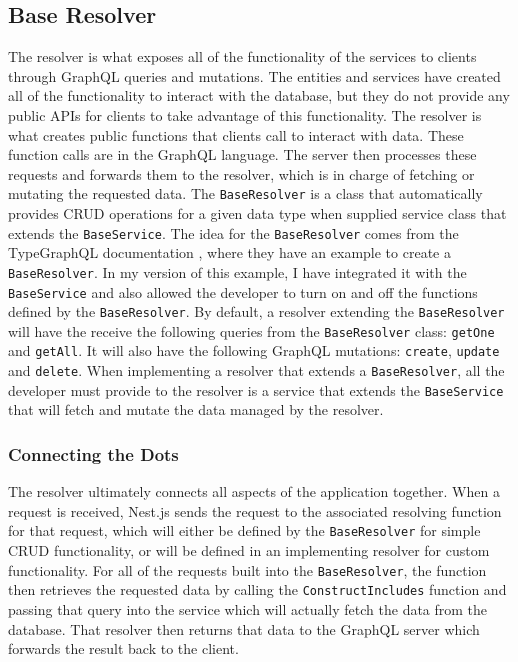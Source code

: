 \subsection{Base Resolver}
The resolver is what exposes all of the functionality of the services to clients through GraphQL queries and mutations. The entities and services have created all of the functionality to interact with the database, but they do not provide any public APIs for clients to take advantage of this functionality.  The resolver is what creates public functions that clients call to interact with data.  These function calls are in the GraphQL language.  The server then processes these requests and forwards them to the resolver, which is in charge of fetching or mutating the requested data.  The \verb!BaseResolver! is a class that automatically provides CRUD operations for a given data type when supplied service class that extends the \verb!BaseService!. The idea for the \verb!BaseResolver! comes from the TypeGraphQL documentation \cite{lytekTypegraphql2019}, where they have an example to create a \verb!BaseResolver!.  In my version of this example, I have integrated it with the \verb!BaseService! and also allowed the developer to turn on and off the functions defined by the \verb!BaseResolver!. By default, a resolver extending the \verb!BaseResolver! will have the receive the following queries from the \verb!BaseResolver! class: \verb!getOne! and \verb!getAll!.  It will also have the following GraphQL mutations: \verb!create!, \verb!update! and \verb!delete!.  When implementing a resolver that extends a \verb!BaseResolver!, all the developer must provide to the resolver is a service that extends the \verb!BaseService! that will fetch and mutate the data managed by the resolver.

\subsubsection{Connecting the Dots}

The resolver ultimately connects all aspects of the application together.  When a request is received, Nest.js sends the request to the associated resolving function for that request, which will either be defined by the \verb!BaseResolver! for simple CRUD functionality, or will be defined in an implementing resolver for custom functionality.  For all of the requests built into the \verb!BaseResolver!, the function then retrieves the requested data by calling the \verb!ConstructIncludes! function and passing that query into the service which will actually fetch the data from the database.  That resolver then returns that data to the GraphQL server which forwards the result back to the client.

